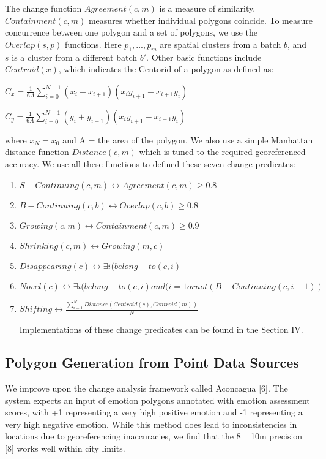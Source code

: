 \documentclass[conference]{IEEEtran}
\begin{document}
The change function $Agreement(c, m)$ is a measure of similarity. $Containment(c, m)$ measures whether individual polygons coincide. To measure concurrence between one polygon and a set of polygons, we use the $Overlap(s,p)$ functions. Here $p_1,...,p_m$ are spatial clusters from a batch $b$, and $s$ is a cluster from a different batch $b'$. Other basic functions include $Centroid(x)$, which indicates the Centorid of a polygon as defined as:

$C_x =\frac{1}{6A} \sum_{i=0}^{N-1}(x_i+x_{i+1})(x_iy_{i+1}-x_{i+1}y_i)$

$C_y =\frac{1}{6A} \sum_{i=0}^{N-1}(y_i+y_{i+1})(x_iy_{i+1}-x_{i+1}y_i)$

where $x_N=x_0$ and A = the area of the polygon. We also use a simple Manhattan distance function $Distance(c, m)$ which is tuned to the required georeferenced accuracy. We use all these functions to defined these seven change predicates:

\begin{enumerate}
	\item $S-Continuing (c,m)  \leftrightarrow  Agreement (c,m) \geq 0.8$
	\item $B-Continuing(c,b)  \leftrightarrow  Overlap (c,b) \geq 0.8$
	\item $Growing(c,m)  \leftrightarrow  Containment (c,m) \geq 0.9 $
	\item $Shrinking(c,m) \leftrightarrow Growing (m,c)$
	\item $Disappearing(c) \leftrightarrow \exists i (belong-to(c,i) $
	\item $Novel (c) \leftrightarrow  \exists i (belong-to(c,i) and (i=1 or not(B-Continuing(c,i-1)) $
	\item $Shifting \leftrightarrow \frac{\sum_{i=1}^{N}Distance (Centroid(c), Centroid(m))}{N}$

Implementations of these change predicates can be found in the Section IV.
\end{enumerate}



\subsection{Polygon Generation from Point Data Sources}
We improve upon the change analysis framework called Aconcagua [6]. The system expects an input of emotion polygons annotated with emotion assessment scores, with +1 representing a very high positive emotion and -1 representing a very high negative emotion. While this method does lead to inconsistencies in locations due to georeferencing inaccuracies, we find that the 8 ~ 10m precision [8] works well within city limits.
\end{document}
